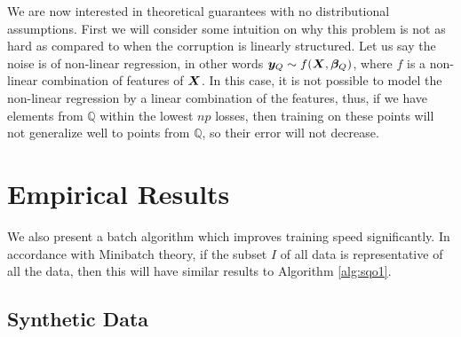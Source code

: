 \documentclass{article} %
\begin{document}
	We are now interested in theoretical guarantees with no distributional assumptions. First we will consider some intuition on why this problem is not as hard as compared to when the corruption is linearly structured. Let us say the noise is of non-linear regression, in other words ${\bm{y}}_Q \sim f({\bm{X}},{\bm{\beta}}_Q)$, where $f$ is a non-linear combination of features of ${\bm{X}}$. In this case, it is not possible to model the non-linear regression by a linear combination of the features, thus, if we have elements from $\mathbb{Q}$ within the lowest $np$ losses, then training on these points will not generalize well to points from $\mathbb{Q}$, so their error will not decrease. 

	
	\section{Empirical Results}\label{sec:numerical-experiments}

	We also present a batch algorithm which improves training speed significantly. In accordance with Minibatch theory, if the subset $I$ of all data is representative of all the data, then this will have similar results to Algorithm \ref{alg:sqo1}.

	\subsection{Synthetic Data}
	
\end{document}
